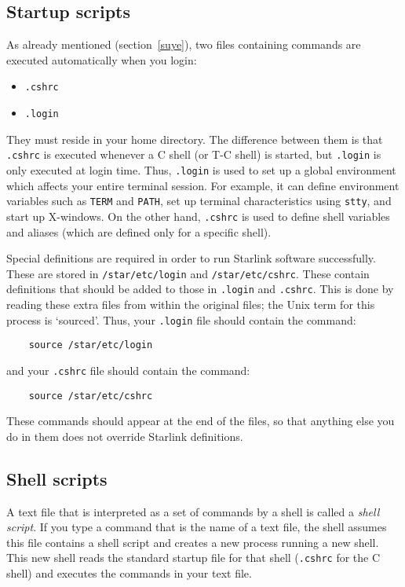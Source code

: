 \subsection{Startup scripts}
\label{ss1}

As already mentioned (section~\ref{suye}), two files containing commands are
executed automatically when you login:
\begin{itemize}
\item {\tt .cshrc}
\item {\tt .login}
\end{itemize}
They must reside in your home directory.
The difference between them is that {\tt .cshrc} is executed whenever a C shell
(or T-C shell) is started, but {\tt .login} is only executed at login time.
Thus, {\tt .login} is used to set up a global environment which affects your
entire terminal session.
For example, it can define environment variables such as {\tt TERM} and
{\tt PATH}, set up terminal characteristics using {\tt stty}, and start up
X-windows.
On the other hand, {\tt .cshrc} is used to define shell variables and aliases
(which are defined only for a specific shell).

Special definitions are required in order to run Starlink software successfully.
These are stored in {\tt /star/etc/login} and {\tt /star/etc/cshrc}.
These contain definitions that should be added to those in {\tt .login} and
{\tt .cshrc}.
This is done by reading these extra files from within the original files; the
Unix term for this process is `sourced'.
Thus, your {\tt .login} file should contain the command:
\begin{verbatim}
    source /star/etc/login
\end{verbatim}
and your {\tt .cshrc} file should contain the command:
\begin{verbatim}
    source /star/etc/cshrc
\end{verbatim}
These commands should appear at the end of the files, so that anything else
you do in them does not override Starlink definitions.

\subsection{Shell scripts}
\label{ss2}

A text file that is interpreted as a set of commands by a shell is called a
{\em shell script}.
If you type a command that is the name of a text file, the shell assumes this
file contains a shell script and creates a new process running a new shell.
This new shell reads the standard startup file for that shell ({\tt .cshrc}
for the C shell) and executes the commands in your text file.

